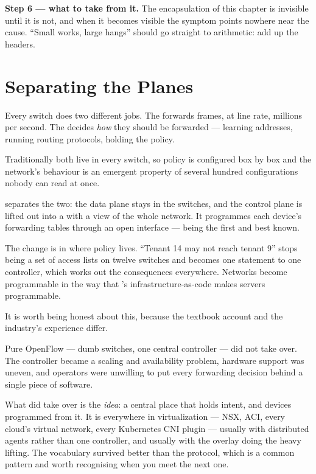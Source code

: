 \begin{worked}
\smallskip
\textbf{Step 6 --- what to take from it.} The encapsulation of this chapter is
invisible until it is not, and when it becomes visible the symptom points
nowhere near the cause. ``Small works, large hangs'' should go straight to
arithmetic: add up the headers.
\end{worked}

\section{Separating the Planes}

Every switch does two different jobs. The  forwards frames, at
line rate, millions per second. The  decides \emph{how}
they should be forwarded --- learning addresses, running routing protocols,
holding the policy.

Traditionally both live in every switch, so policy is configured box by box and
the network's behaviour is an emergent property of several hundred
configurations nobody can read at once.

\begin{definitionbox}
 separates the two: the data plane stays in the switches, and the
control plane is lifted out into a  with a view of the whole
network. It programmes each device's forwarding tables through an open
interface ---  being the first and best known.

\smallskip
The change is in where policy lives. ``Tenant 14 may not reach tenant 9'' stops
being a set of access lists on twelve switches and becomes one statement to one
controller, which works out the consequences everywhere. Networks become
programmable in the way that 's infrastructure-as-code makes
servers programmable.
\end{definitionbox}

\begin{conceptbox}
It is worth being honest about this, because the textbook account and the
industry's experience differ.

\smallskip
Pure OpenFlow --- dumb switches, one central controller --- did not take over.
The controller became a scaling and availability problem, hardware support was
uneven, and operators were unwilling to put every forwarding decision behind a
single piece of software.

\smallskip
What did take over is the \emph{idea}: a central place that holds intent, and
devices programmed from it. It is everywhere in virtualization --- NSX, ACI,
every cloud's virtual network, every Kubernetes CNI plugin --- usually with
distributed agents rather than one controller, and usually with the overlay
doing the heavy lifting. The vocabulary survived better than the protocol,
which is a common pattern and worth recognising when you meet the next one.
\end{conceptbox}

